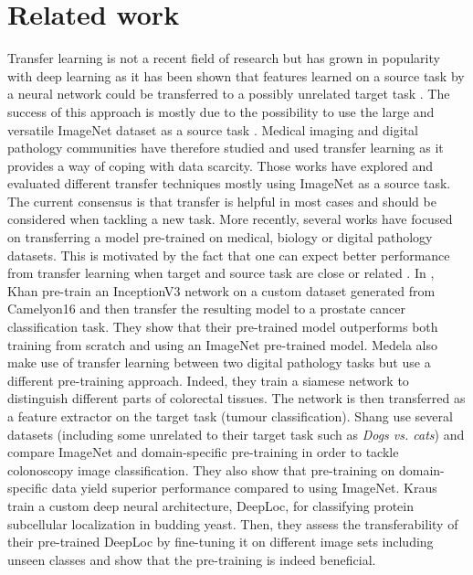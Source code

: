 \section{Related work}
\label{sec:mtask:relatedwork}

Transfer learning is not a recent field of research \parencite{pan2010survey} but has grown in popularity with deep learning as it has been shown that features learned on a source task by a neural network could be transferred to a possibly unrelated target task \parencite{sermanet2013overfeat, razavian2014cnn, yosinski2014transferable}. The success of this approach is mostly due to the possibility to use the large and versatile ImageNet \parencite{deng2009imagenet} dataset as a source task \parencite{kornblith2019better}. Medical imaging and digital pathology communities have therefore studied and used transfer learning \parencite{tajbakhsh2016convolutional, shin2016deep, mormont2018comparison, babaie2019tissuefold, ponzio2019dealing} as it provides a way of coping with data scarcity. Those works have explored and evaluated different transfer techniques mostly using ImageNet as a source task. The current consensus is that transfer is helpful in most cases and should be considered when tackling a new task. More recently, several works have focused on transferring a model pre-trained on medical, biology or digital pathology datasets. This is motivated by the fact that one can expect better performance from transfer learning when target and source task are close or related \parencite{yosinski2014transferable}. In \parencite{khan2019improving}, Khan \etal pre-train an InceptionV3 network \parencite{szegedy2017inception} on a custom dataset generated from Camelyon16 \parencite{bejnordi2017diagnostic} and then transfer the resulting model to a prostate cancer classification task. They show that their pre-trained model outperforms both training from scratch and using an ImageNet pre-trained model. Medela \etal \parencite{medela2019few} also make use of transfer learning between two digital pathology tasks but use a different pre-training approach. Indeed, they train a siamese network to distinguish different parts of colorectal tissues. The network is then transferred as a feature extractor on the target task (tumour classification). Shang \etal \parencite{shang2019and} use several datasets (including some unrelated to their target task such as \textit{Dogs vs. cats}) and compare ImageNet and domain-specific pre-training in order to tackle colonoscopy image classification. They also show that pre-training on domain-specific data yield superior performance compared to using ImageNet. Kraus \etal \parencite{kraus2017automated} train a custom deep neural architecture, DeepLoc, for classifying protein subcellular localization in budding yeast. Then, they assess the transferability of their pre-trained DeepLoc by fine-tuning it on different image sets including unseen classes and show that the pre-training is indeed beneficial.


